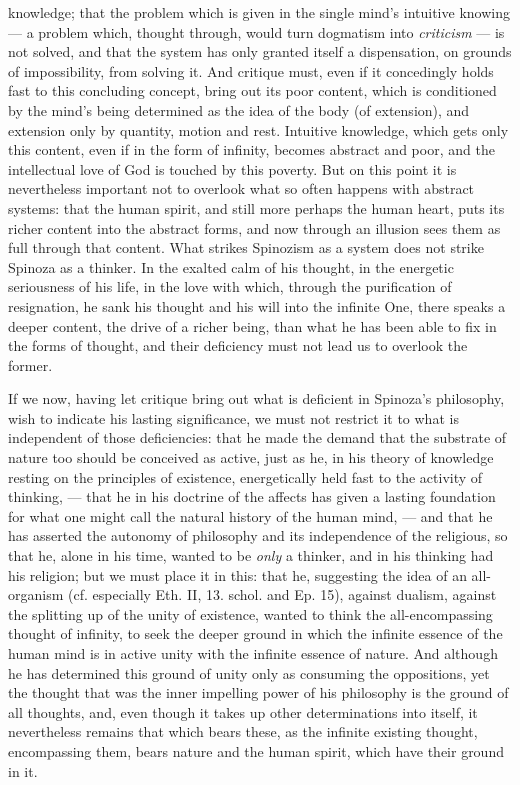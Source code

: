 \documentclass[12pt,a4paper,openany]{book}
\newcommand{\opage}[1]{\marginnote{\footnotesize\textit{[#1]}}}
\begin{document}
knowledge; that the problem which is
given in the single mind's intuitive knowing --- a problem
which, thought through, would turn dogmatism into \emph{criticism}
--- is not solved, and that the system has only granted itself
a dispensation, on grounds of impossibility, from solving it. And critique must,
even if it concedingly holds fast to this concluding concept,
bring out its poor content, which is conditioned by the
mind's being determined as the idea of the body (of extension),
and extension only by quantity, motion and rest.
Intuitive knowledge, which gets only this content, even if in
the form of infinity, becomes abstract and poor, and the intellectual
love of God is touched by this poverty.
But on this point it is nevertheless important not to overlook what
so often happens with abstract systems: that the human spirit,
and still more perhaps the human heart, puts its richer content
into the abstract forms, and now through an illusion
sees them as full through that content. What strikes
Spinozism as a system does not strike Spinoza as a thinker.
In the exalted calm of his thought, in the energetic seriousness of his life,
in the love with which, through the purification of resignation,
he sank his thought and his will into the infinite
One, there speaks a deeper content, the drive of a richer being,
\opage{181} than what he has been able to fix in the forms of thought, and their
deficiency must not lead us to overlook the former.

If we now, having let critique bring out what is
deficient in Spinoza's philosophy, wish to indicate his lasting
significance, we must not restrict it to what is independent of those
deficiencies: that he made the demand that
the substrate of nature too should be conceived as active, just as
he, in his theory of knowledge resting on the principles of existence,
energetically held fast to the activity of thinking, --- that
he in his doctrine of the affects has given a lasting foundation
for what one might call the natural history of the human mind,
--- and that he has asserted the autonomy of philosophy
and its independence of the religious, so that he, alone in his
time, wanted to be \emph{only} a thinker, and in his thinking had
his religion; but we must place it in this: that he, suggesting
the idea of an all-organism (cf. especially Eth. II, 13. schol. and
Ep. 15), against dualism, against the splitting up of the unity
of existence, wanted to think the all-encompassing thought of infinity,
to seek the deeper ground in which the infinite essence of the human
mind is in active unity with the infinite essence of nature.
And although he has determined this ground of unity
only as consuming the oppositions, yet
the thought that was the inner impelling power of his philosophy
is the ground of all thoughts, and, even though it takes up other
determinations into itself, it nevertheless remains that which bears these, as
the infinite existing thought, encompassing them, bears nature and
the human spirit, which have their ground in it.
\end{document}
